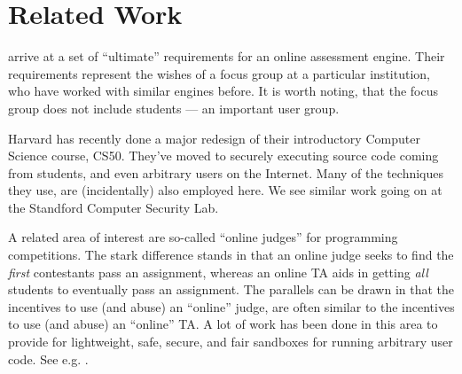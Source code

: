 
\section{Related Work}

\cite{sclater-howie-2003}  arrive at a set of ``ultimate'' requirements for an
online assessment engine. Their requirements represent the wishes of a focus
group at a particular institution, who have worked with similar engines before.
It is worth noting, that the focus group does not include students --- an
important user group.

Harvard has recently done a major redesign of their introductory Computer
Science course, CS50\cite{malan-2010a}. They've moved to securely executing
source code coming from students, and even arbitrary users on the
Internet\cite{malan-2010b,malan-2013}. Many of the techniques they use, are
(incidentally) also employed here. We see similar work going on at the
Standford Computer Security Lab\cite{stefan-2013}.

A related area of interest are so-called ``online judges'' for programming
competitions. The stark difference stands in that an online judge seeks to find
the \emph{first} contestants pass an assignment, whereas an online TA aids in
getting \emph{all} students to eventually pass an assignment. The parallels can
be drawn in that the incentives to use (and abuse) an ``online'' judge, are
often similar to the incentives to use (and abuse) an ``online'' TA. A lot of
work has been done in this area to provide for lightweight, safe, secure, and
fair sandboxes for running arbitrary user code. See e.g. \cite{domjudge-2014}.
